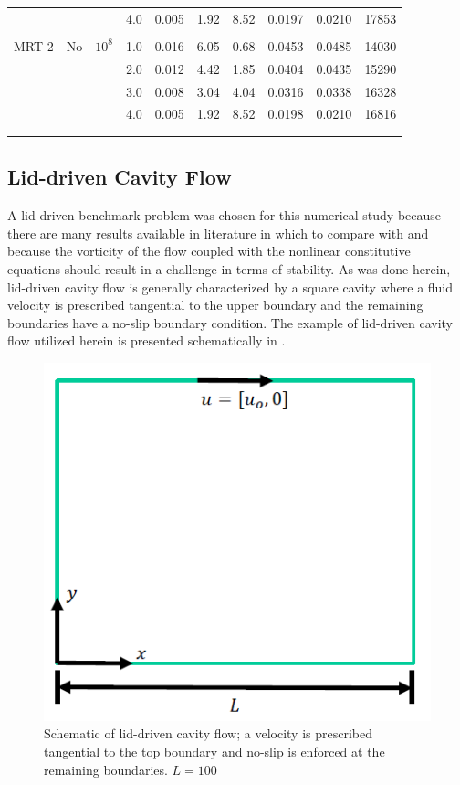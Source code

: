 \begin{table}
\begin{tabulary}{\linewidth}{l l r r r r r r r r}
                      & & & 4.0 & 0.005 & 1.92 & 8.52 & 0.0197 & 0.0210 & 17853 \\
		\\
		MRT-2 & No & $10^8$ & 1.0 & 0.016 & 6.05 & 0.68 & 0.0453 & 0.0485 & 14030 \\
					& & & 2.0 & 0.012 & 4.42 & 1.85 & 0.0404 & 0.0435 & 15290 \\
					& & & 3.0 & 0.008 & 3.04 & 4.04 & 0.0316 & 0.0338 & 16328 \\
					& & & 4.0 & 0.005 & 1.92 & 8.52 & 0.0198 & 0.0210 & 16816 \\
		\\
		\label{tab:poise-bing-2}
	\end{tabulary}
\end{table}

\subsection{Lid-driven Cavity Flow} %

A lid-driven benchmark problem was chosen for this numerical study because there are many results available in literature in which to compare with and because the vorticity of the flow coupled with the nonlinear constitutive equations should result in a challenge in terms of stability.
As was done herein, lid-driven cavity flow is generally characterized by a square cavity where a fluid velocity is prescribed tangential to the upper boundary and the remaining boundaries have a no-slip boundary condition.
The example of lid-driven cavity flow utilized herein is presented schematically in .

\begin{figure}
\centering
\includegraphics{figs/lid-driven}
\caption{Schematic of lid-driven cavity flow; a velocity is prescribed tangential to the top boundary and no-slip is enforced at the remaining boundaries. $L = 100$}
\label{fig:lid-driven}
\end{figure}

